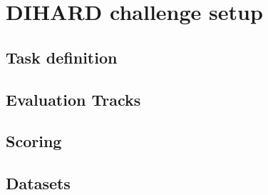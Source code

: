\chapter{DIHARD challenge setup}

\section{Task definition}
\section{Evaluation Tracks}
\section{Scoring}
\section{Datasets}